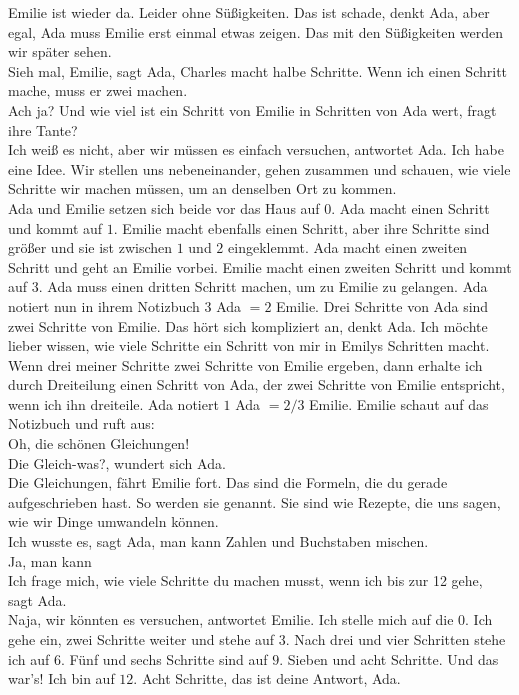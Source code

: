 Emilie ist wieder da. Leider ohne Süßigkeiten. Das ist schade, denkt Ada, aber egal, Ada muss Emilie erst einmal etwas zeigen. Das mit den Süßigkeiten werden wir später sehen.\\
\frqq{}Sieh mal, Emilie\flqq{}, sagt Ada, \frqq{}Charles macht halbe Schritte. Wenn ich einen Schritt mache, muss er zwei machen.\flqq{}\\
\frqq{}Ach ja? Und wie viel ist ein Schritt von Emilie in Schritten von Ada wert, fragt ihre Tante?\flqq{}\\
\frqq{}Ich weiß es nicht, aber wir müssen es einfach versuchen\flqq{}, antwortet Ada. \frqq{}Ich habe eine Idee. Wir stellen uns nebeneinander, gehen zusammen und schauen, wie viele Schritte wir machen müssen, um an denselben Ort zu kommen.\flqq{}\\
Ada und Emilie setzen sich beide vor das Haus auf $0$. Ada macht einen Schritt und kommt auf $1$. Emilie macht ebenfalls einen Schritt, aber ihre Schritte sind größer und sie ist zwischen $1$ und $2$ eingeklemmt.
Ada macht einen zweiten Schritt und geht an Emilie vorbei. Emilie macht einen zweiten Schritt und kommt auf $3$.  Ada muss einen dritten Schritt machen, um zu Emilie zu gelangen.
Ada notiert nun in ihrem Notizbuch $3$ Ada $= 2$ Emilie. Drei Schritte von Ada sind zwei Schritte von Emilie. Das hört sich kompliziert an, denkt Ada. Ich möchte lieber wissen, wie viele Schritte ein Schritt von mir in Emilys Schritten macht. Wenn drei meiner Schritte zwei Schritte von Emilie ergeben, dann erhalte ich durch Dreiteilung einen Schritt von Ada, der zwei Schritte von Emilie entspricht, wenn ich ihn dreiteile. Ada notiert $1$ Ada $= 2/3$ Emilie.
Emilie schaut auf das Notizbuch und ruft aus: \\
\frqq{}Oh, die schönen Gleichungen!\flqq{}\\
\frqq{}Die Gleich-was?\flqq{}, wundert sich Ada.\\
\frqq{}Die Gleichungen\flqq{}, fährt Emilie fort. \frqq{}Das sind die Formeln, die du gerade aufgeschrieben hast. So werden sie genannt. Sie sind wie Rezepte, die uns sagen, wie wir Dinge umwandeln können.\flqq{}\\
\frqq{}Ich wusste es\flqq{}, sagt Ada, \frqq{}man kann Zahlen und Buchstaben mischen.\flqq{}\\
\frqq{}Ja, man kann\flqq{}\\
\frqq{}Ich frage mich, wie viele Schritte du machen musst, wenn ich bis zur 12 gehe\flqq{}, sagt Ada.\\
\frqq{}Naja, wir könnten es versuchen\flqq{}, antwortet Emilie. \frqq{}Ich stelle mich auf die $0$. Ich gehe ein, zwei Schritte weiter und stehe auf $3$. Nach drei und vier Schritten stehe ich auf $6$. Fünf und sechs Schritte sind auf $9$. Sieben und acht Schritte. Und das war's! Ich bin auf $12$. Acht Schritte, das ist deine Antwort, Ada.\flqq{}\\
